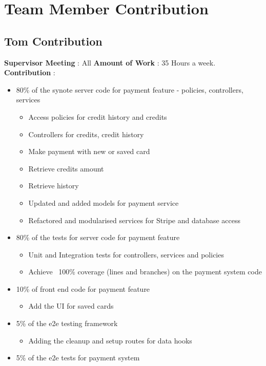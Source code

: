 \chapter{Team Member Contribution}
\label{appendix:team-member-contribution}

\section{Tom Contribution}
\textbf{Supervisor Meeting} : All
\textbf{Amount of Work} : 35 Hours a week.
\textbf{Contribution} : 
\begin{itemize}
	\item 80\% of the synote server code for payment feature - policies, controllers, services
		\begin{itemize}
			\item Access policies for credit history and credits
			\item Controllers for credits, credit history
			\item Make payment with new or saved card
			\item Retrieve credits amount
			\item Retrieve history
			\item Updated and added models for payment service
			\item Refactored and modularised services for Stripe and database access
		\end{itemize}
	\item 80\% of the tests for server code for payment feature
		\begin{itemize}
			\item Unit and Integration tests for controllers, services and policies
			\item Achieve ~100\% coverage (lines and branches) on the payment system code
		\end{itemize}		 
	\item 10\% of front end code for payment feature
		\begin{itemize}
			\item Add the UI for saved cards
		\end{itemize}
	\item 5\% of the e2e testing framework
		\begin{itemize}
			\item Adding the cleanup and setup routes for data hooks
		\end{itemize}
	\item 5\% of the e2e tests for payment system

\end{itemize}
